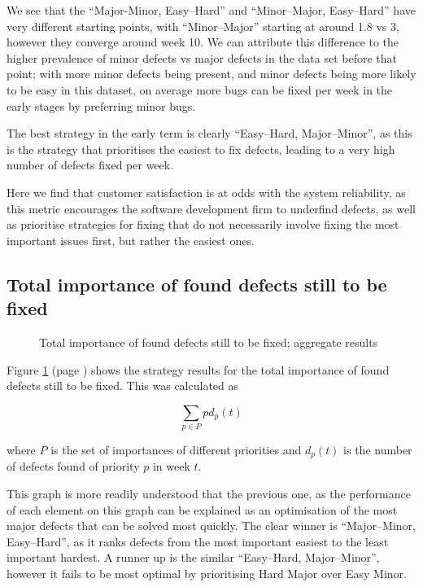 \documentclass[a4paper,10pt]{article}
\begin{document}
We see that the ``Major-Minor, Easy--Hard'' and ``Minor--Major, Easy--Hard'' have very different starting points, with ``Minor--Major'' starting at around 1.8 vs 3, however they converge around week 10. We can attribute this difference to the higher prevalence of minor defects vs major defects in the data set before that point; with more minor defects being present, and minor defects being more likely to be easy in this dataset, on average more bugs can be fixed per week in the early stages by preferring minor bugs.

The best strategy in the early term is clearly ``Easy--Hard, Major--Minor'', as this is the strategy that prioritises the easiest to fix defects, leading to a very high number of defects fixed per week.

Here we find that customer satisfaction is at odds with the system reliability, as this metric encourages the software development firm to underfind defects, as well as prioritise strategies for fixing that do not necessarily involve fixing the most important issues first, but rather the easiest ones.

\subsection{Total importance of found defects still to be fixed}
\begin{figure}
  \centering
  
  \caption{Total importance of found defects still to be fixed; aggregate results}
  \label{agg:tifd}
\end{figure}

Figure \ref{agg:tifd} (page \pageref{agg:tifd}) shows the strategy results for the total importance of found defects still to be fixed. This was calculated as

$$\sum_{p \in P} p d_p(t)$$

where $P$ is the set of importances of different priorities and $d_p(t)$ is the number of defects found of priority $p$ in week $t$.

This graph is more readily understood that the previous one, as the performance of each element on this graph can be explained as an optimisation of the most major defects that can be solved most quickly. The clear winner is ``Major--Minor, Easy--Hard'', as it ranks defects from the most important easiest to the least important hardest. A runner up is the similar ``Easy--Hard, Major--Minor'', however it fails to be most optimal by prioritising Hard Major over Easy Minor.
\end{document}
